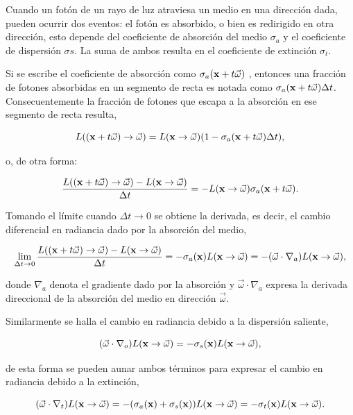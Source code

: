 Cuando un fotón de un rayo de luz atraviesa un medio en una dirección dada, pueden ocurrir dos eventos: el fotón es absorbido, o bien es redirigido en otra dirección, esto depende del coeficiente de absorción del medio $\sigma_{a}$ y el coeficiente de dispersión $\sigma{s}$.
La suma de ambos resulta en el coeficiente de extinción $\sigma_{t}$.

Si se escribe el coeficiente de absorción como $\sigma_{a}(\bold{x} + t\vec{\omega})$ , entonces una fracción de fotones absorbidas en un segmento de recta es notada como $\sigma_{a}(\bold{x} + t\vec{\omega}) \Delta t$.
Consecuentemente la fracción de fotones que escapa a la absorción en ese segmento de recta resulta,

$$L((\bold{x}+t\vec{\omega}) \rightarrow \vec{\omega}) = L(\bold{x} \rightarrow \vec{\omega}) (1-\sigma_{a}(\bold{x} + t\vec{\omega}) \Delta t),$$

o, de otra forma:

$$\frac{L((\bold{x}+t\vec{\omega}) \rightarrow \vec{\omega}) - L(\bold{x} \rightarrow \vec{\omega}) }{ \Delta t } = - L(\bold{x} \rightarrow \vec{\omega}) \sigma_{a}(\bold{x} + t\vec{\omega}).$$

Tomando el límite cuando $\Delta t \rightarrow 0$ se obtiene la derivada, es decir, el cambio diferencial en radiancia dado por la absorción del medio,

$$\lim_{\Delta t \rightarrow 0} \frac{L((\bold{x}+t\vec{\omega}) \rightarrow \vec{\omega}) - L(\bold{x} \rightarrow \vec{\omega}) }{ \Delta t } = - \sigma_{a}(\bold{x}) L(\bold{x} \rightarrow \vec{\omega})  = -(\vec{\omega} \cdot \nabla_{a}) L(\bold{x} \rightarrow \vec{\omega}),$$

donde $\nabla_{a}$ denota el gradiente dado por la absorción y $ \vec{\omega} \cdot \nabla_{a}$ expresa la derivada direccional de la absorción del medio en dirección $\vec{\omega}$.

Similarmente se halla el cambio en radiancia debido a la dispersión saliente,

$$ (\vec{\omega} \cdot \nabla_{o}) L(\bold{x} \rightarrow \vec{\omega}) = -\sigma_{s}(\bold{x}) L(\bold{x} \rightarrow \vec{\omega}),$$

de esta forma se pueden aunar ambos términos para expresar el cambio en radiancia debido a la extinción,

$$(\vec{\omega} \cdot \nabla_{t}) L(\bold{x} \rightarrow \vec{\omega}) = -(\sigma_{a}(\bold{x})+\sigma_{s}(\bold{x})) L(\bold{x} \rightarrow \vec{\omega}) = -\sigma_{t}(\bold{x}) L(\bold{x} \rightarrow \vec{\omega}).$$

